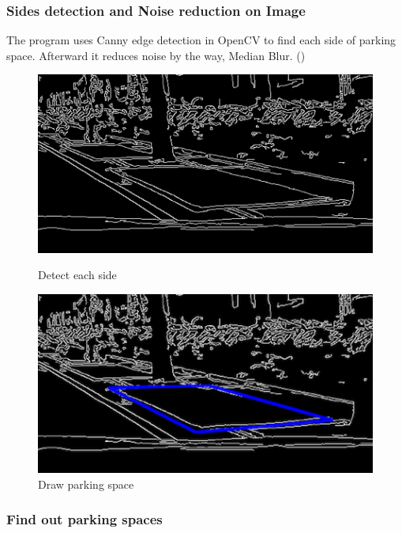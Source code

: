 \documentclass[runningheads,a4paper]{llncs}
\begin{document}
\subsubsection{Sides detection and Noise reduction on Image} 

The program uses Canny edge detection in OpenCV to find each side of
parking space. Afterward it reduces noise by the way, Median Blur.
()

\begin{figure}[tbp]
	\begin{minipage}{.4\textwidth}
		\centering
		\includegraphics[scale=0.7]{Figures/sideDetecting.png}
		\caption{Detect each side}
		\label{sideDetecting}
	\end{minipage}
	\hspace{0.5in}
	\begin{minipage}{.4\textwidth}
		\centering
		\includegraphics[scale=0.7]{Figures/drawParkingSpace.png}
		\caption{Draw parking space}
		\label{drawParkingSpace}
	\end{minipage}
\end{figure}

\subsubsection{Find out parking spaces}
\end{document}
